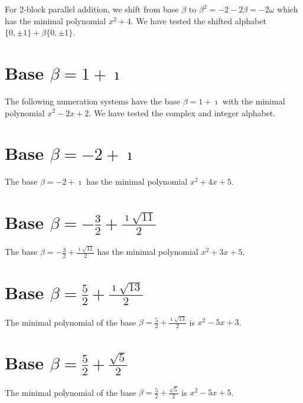 For 2-block parallel addition, we shift from base $\beta$ to $\beta^2=-2-2\beta=-2\omega$ which has the minimal polynomial $x^{2} + 4$. We have tested the shifted alphabet $\{0,\pm 1\}+\beta \{0,\pm 1\}$.



\section{\texorpdfstring{Base $\beta = 1 + \imath$}{Base beta = 1 + i}}
The following numeration systems have the base $\beta =1 + \imath$ with the minimal polynomial $x^2-2x+2$. We have tested the complex and integer alphabet.



 

\section{\texorpdfstring{Base $\beta = -2 + \imath$}{Base beta = -2 + i}}
The base  $\beta = -2 + \imath$ has the minimal polynomial $x^2+4x +5$.

% 
\section{\texorpdfstring{Base $\beta = -\frac{3}{2} + \frac{\imath \sqrt{11}}{2}$}{Base beta = -{3}/{2} + i sqrt(11)/{2}}}
The base $\beta = -\frac{3}{2} + \frac{\imath \sqrt{11}}{2}$ has the minimal polynomial  $x^2+3x +5$.


\section{\texorpdfstring{Base $\beta = \frac{5}{2} + \frac{\imath \sqrt{13}}{2}$}{Base beta = {5}/{2} + i sqrt(13)/2}}
The minimal polynomial of the base $\beta = \frac{5}{2} + \frac{\imath \sqrt{13}}{2}$ is $x^2 -5x+3$.


\section{\texorpdfstring{Base $\beta = \frac{5}{2} + \frac{\sqrt{5}}{2}$}{Base beta = {5}/{2} + sqrt(5)/{2}}}
The minimal polynomial of the base $\beta = \frac{5}{2} + \frac{\sqrt{5}}{2}$ is $x^2 -5x+5$.


